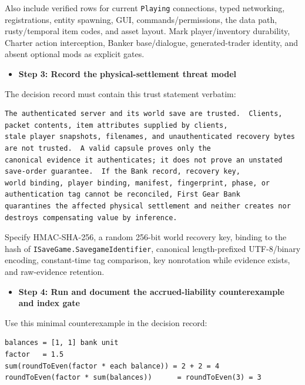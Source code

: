 \documentclass[
  10pt,
  letterpaper,
]{article}
\newcommand{\passthrough}[1]{#1}
\providecommand{\tightlist}{%
  \setlength{\itemsep}{0pt}\setlength{\parskip}{0pt}}
\begin{document}
Also include verified rows for current \passthrough{\lstinline!Playing!}
connections, typed networking, registrations, entity spawning, GUI,
commands/permissions, the data path, rusty/temporal item codes, and
asset layout. Mark player/inventory durability, Charter action
interception, Banker base/dialogue, generated-trader identity, and
absent optional mods as explicit gates.

\begin{itemize}
\tightlist
\item[$\square$]
  \textbf{Step 3: Record the physical-settlement threat model}
\end{itemize}

The decision record must contain this trust statement verbatim:

\begin{lstlisting}
The authenticated server and its world save are trusted.  Clients, packet contents, item attributes supplied by clients,
stale player snapshots, filenames, and unauthenticated recovery bytes are not trusted.  A valid capsule proves only the
canonical evidence it authenticates; it does not prove an unstated save-order guarantee.  If the Bank record, recovery key,
world binding, player binding, manifest, fingerprint, phase, or authentication tag cannot be reconciled, First Gear Bank
quarantines the affected physical settlement and neither creates nor destroys compensating value by inference.
\end{lstlisting}

Specify HMAC-SHA-256, a random 256-bit world recovery key, binding to
the hash of \texttt{ISaveGame.}\allowbreak{}\texttt{SavegameIdentifier},
canonical length-prefixed UTF-8/binary encoding, constant-time tag
comparison, key nonrotation while evidence exists, and raw-evidence
retention.

\begin{itemize}
\tightlist
\item[$\square$]
  \textbf{Step 4: Run and document the accrued-liability counterexample
  and index gate}
\end{itemize}

Use this minimal counterexample in the decision record:

\begin{lstlisting}
balances = [1, 1] bank unit
factor   = 1.5
sum(roundToEven(factor * each balance)) = 2 + 2 = 4
roundToEven(factor * sum(balances))      = roundToEven(3) = 3
\end{lstlisting}
\end{document}
